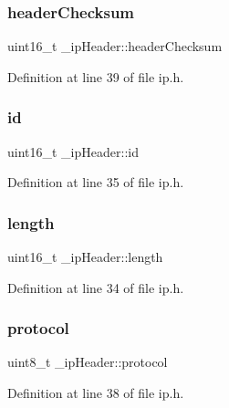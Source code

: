 \subsubsection{\texorpdfstring{header\+Checksum}{headerChecksum}}
{\footnotesize\ttfamily uint16\+\_\+t \+\_\+ip\+Header\+::header\+Checksum}



Definition at line 39 of file ip.\+h.

\mbox{\label{struct__ipHeader_a7d8dea2d6d12f6a9df6aa7351eb0f51e}} 
\subsubsection{\texorpdfstring{id}{id}}
{\footnotesize\ttfamily uint16\+\_\+t \+\_\+ip\+Header\+::id}



Definition at line 35 of file ip.\+h.

\mbox{\label{struct__ipHeader_aa57d8aded3d774453b430c48b537037b}} 
\subsubsection{\texorpdfstring{length}{length}}
{\footnotesize\ttfamily uint16\+\_\+t \+\_\+ip\+Header\+::length}



Definition at line 34 of file ip.\+h.

\mbox{\label{struct__ipHeader_a2fd883d2f1fae6b284bffe605c7c0191}} 
\subsubsection{\texorpdfstring{protocol}{protocol}}
{\footnotesize\ttfamily uint8\+\_\+t \+\_\+ip\+Header\+::protocol}



Definition at line 38 of file ip.\+h.

\mbox{\label{struct__ipHeader_a78817fe0f8a50b109a2d363908aacd7e}} 

